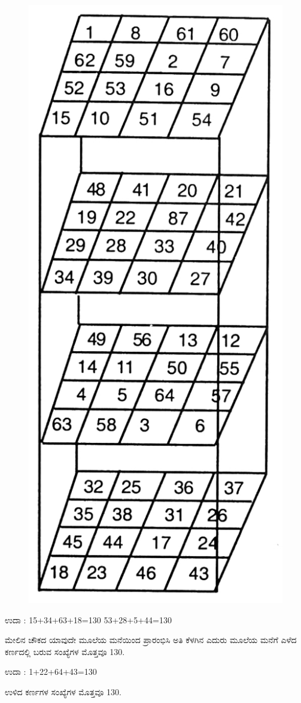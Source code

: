 \begin{minipage}{4cm}
\begin{figure}[H]
\includegraphics{src/figures/chap8/fig8-11.jpg}
\end{figure}
\end{minipage}
\quad
\begin{minipage}{5.3cm}
ಉದಾ : 15+34+63+18=130 53+28+5+44=130

ಮೇಲಿನ ಚೌಕದ ಯಾವುದೇ ಮೂಲೆಯ ಮನೆಯಿಂದ ಪ್ರಾರಂಭಿಸಿ ಅತಿ ಕೆಳಗಿನ ಎದುರು ಮೂಲೆಯ ಮನೆಗೆ ಎಳೆದ ಕರ್ಣದಲ್ಲಿ ಬರುವ ಸಂಖ್ಯೆಗಳ ಮೊತ್ತವೂ 130.

ಉದಾ : 1+22+64+43=130

ಉಳಿದ ಕರ್ಣಗಳ ಸಂಖ್ಯೆಗಳ ಮೊತ್ತವೂ 130.
\end{minipage}

